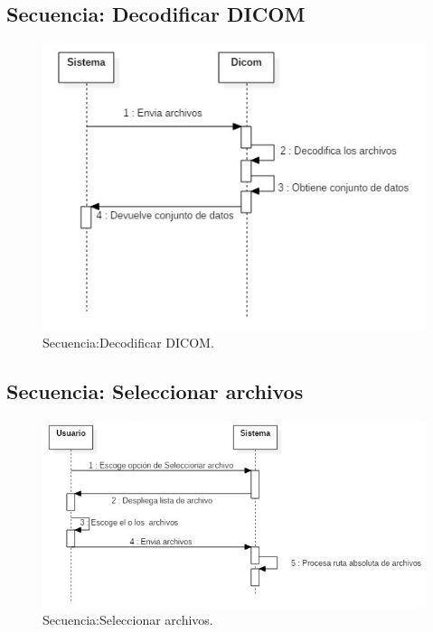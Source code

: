 \documentclass[12pt]{report}
\begin{document}
\subsection{Secuencia: Decodificar DICOM}
\begin{figure}[H]
\centering
\includegraphics[width = 12 cm, height = 7 cm]{Decodificar}
\caption{Secuencia:Decodificar DICOM.}
\end{figure}

\subsection{Secuencia: Seleccionar archivos}
\begin{figure}[H]
\centering
\includegraphics[width = 12 cm, height = 7 cm]{seleccionar_archivo}
\caption{Secuencia:Seleccionar archivos.}
\end{figure}
\end{document}
